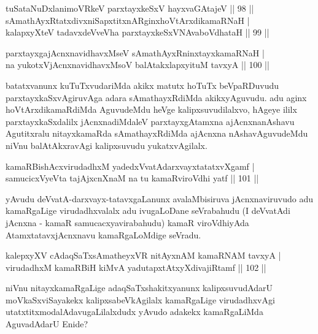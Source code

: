 \begin{shl}
tuSataNuDxlanimoVRkeV parxtayxkeSxV hayxvaGAtajeV \hfill || 98 ||	\\
sAmathAyxRtatxdivxniSapxtitxnARginxhoVtArxdikamaRNaH |\\
kalapxyXteV tadavxdeVveVha parxtayxkeSxVNAvaboVdhataH \hfill || 99 ||
\end{shl}

\begin{shl}
parxtayxgajAcnxnavidhavxMseV sAmathAyxRninxtayxkamaRNaH |\\
na yukotxV\s jAcnxnavidhavxMsoV balAtakxlapxyituM tavxyA \hfill || 100 ||
\end{shl}

\begin{artha}
batatxvanunx kuTuTxvudariMda akikx matutx hoTuTx beVpaRDuvudu parxtayxkaSxvAgiruvAga adara sAmathayxRdiMda akikxyAguvudu. adu aginx hoVtArxdikamaRdiMda AguvudeMdu heVge kalipxsuvudilalxvo, hAgeye ililx parxtayxkaSxdalilx jAcnxnadiMdaleV parxtayxgAtamxna ajAcnxnanAshavu Agutitxralu nitayxkamaRda sAmathayxRdiMda ajAcnxna nAshavAguvudeMdu niVnu balAtAkxravAgi kalipxsuvudu yukatxvAgilalx.
\end{artha}


\begin{shl}
kamaRBishAcxvirudadhxM yadedxVvatAdarxvayxtatatxvXgamf |\\
samucicxVyeVta tajAjxcnXnaM na tu kamaRviroVdhi yatf \hfill || 101 ||
\end{shl}

\begin{artha}
yAvudu deVvatA-darxvayx-tatavxgaLanunx avalaMbisiruva jAcnxnaviruvudo adu kamaRgaLige virudadhxvalalx adu ivugaLoDane seVrabahudu (I deVvatAdi jAcnxna - kamaR samucacxyavirabahudu) kamaR viroVdhiyAda AtamxtatavxjAcnxnavu kamaRgaLoMdige seVradu.
\end{artha}

\begin{shl}
kalepxyXV cAdaqSaTxsAmatheyxVR nitAyxnAM kamaRNAM tavxyA |\\
virudadhxM kamaRBiH kiMvA yadutapxtAtxyXdivajiRtamf \hfill || 102 ||
\end{shl}

\begin{artha}
niVnu nitayxkamaRgaLige adaqSaTxshakitxyanunx kalipxsuvudAdarU moVkaSxviSayakekx kalipxsabeVkAgilalx kamaRgaLige virudadhxvAgi utatxtitxmodalAdavugaLilalxdudx yAvudo adakekx kamaRgaLiMda AguvadAdarU Enide?
\end{artha}

